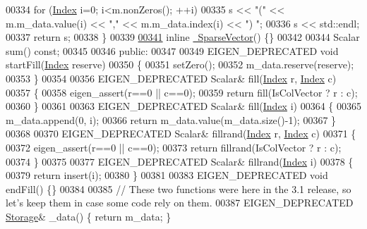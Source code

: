 \begin{DoxyCode}
00334       \textcolor{keywordflow}{for} (\hyperlink{group___core___module_a554f30542cc2316add4b1ea0a492ff02}{Index} i=0; i<m.nonZeros(); ++i)
00335         s << \textcolor{stringliteral}{"("} << m.m\_data.value(i) << \textcolor{stringliteral}{","} << m.m\_data.index(i) << \textcolor{stringliteral}{") "};
00336       s << std::endl;
00337       \textcolor{keywordflow}{return} s;
00338     \}
00339 
\hyperlink{group___sparse_core___module_ad519592c203aedf33c524feb1bdaad1b}{00341}     \textcolor{keyword}{inline} \hyperlink{group___sparse_core___module_ad519592c203aedf33c524feb1bdaad1b}{~SparseVector}() \{\}
00342 
00344     Scalar sum() \textcolor{keyword}{const};
00345 
00346   \textcolor{keyword}{public}:
00347 
00349     EIGEN\_DEPRECATED \textcolor{keywordtype}{void} startFill(\hyperlink{group___core___module_a554f30542cc2316add4b1ea0a492ff02}{Index} reserve)
00350     \{
00351       setZero();
00352       m\_data.reserve(reserve);
00353     \}
00354 
00356     EIGEN\_DEPRECATED Scalar& fill(\hyperlink{group___core___module_a554f30542cc2316add4b1ea0a492ff02}{Index} r, \hyperlink{group___core___module_a554f30542cc2316add4b1ea0a492ff02}{Index} c)
00357     \{
00358       eigen\_assert(r==0 || c==0);
00359       \textcolor{keywordflow}{return} fill(IsColVector ? r : c);
00360     \}
00361 
00363     EIGEN\_DEPRECATED Scalar& fill(\hyperlink{group___core___module_a554f30542cc2316add4b1ea0a492ff02}{Index} i)
00364     \{
00365       m\_data.append(0, i);
00366       \textcolor{keywordflow}{return} m\_data.value(m\_data.size()-1);
00367     \}
00368 
00370     EIGEN\_DEPRECATED Scalar& fillrand(\hyperlink{group___core___module_a554f30542cc2316add4b1ea0a492ff02}{Index} r, \hyperlink{group___core___module_a554f30542cc2316add4b1ea0a492ff02}{Index} c)
00371     \{
00372       eigen\_assert(r==0 || c==0);
00373       \textcolor{keywordflow}{return} fillrand(IsColVector ? r : c);
00374     \}
00375 
00377     EIGEN\_DEPRECATED Scalar& fillrand(\hyperlink{group___core___module_a554f30542cc2316add4b1ea0a492ff02}{Index} i)
00378     \{
00379       \textcolor{keywordflow}{return} insert(i);
00380     \}
00381 
00383     EIGEN\_DEPRECATED \textcolor{keywordtype}{void} endFill() \{\}
00384     
00385     \textcolor{comment}{// These two functions were here in the 3.1 release, so let's keep them in case some code rely on them.}
00387 \textcolor{comment}{}    EIGEN\_DEPRECATED \hyperlink{class_eigen_1_1internal_1_1_compressed_storage}{Storage}& \_data() \{ \textcolor{keywordflow}{return} m\_data; \}

\end{DoxyCode}
